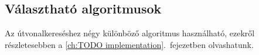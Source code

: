 \subsection{Választható algoritmusok}

Az útvonalkereséshez négy különböző algoritmus használható, ezekről részletesebben a \ref{ch:TODO implementation}.~fejezetben olvashatunk.


		
		
		
		
		
		
		
		
